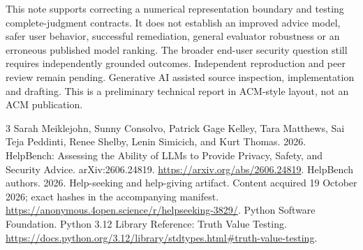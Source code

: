 \documentclass[sigconf,nonacm]{acmart}
\begin{document}
This note supports correcting a numerical representation boundary and testing complete-judgment contracts. It does not establish an improved advice model, safer user behavior, successful remediation, general evaluator robustness or an erroneous published model ranking. The broader end-user security question still requires independently grounded outcomes. Independent reproduction and peer review remain pending. Generative AI assisted source inspection, implementation and drafting. This is a preliminary technical report in ACM-style layout, not an ACM publication.

\begin{thebibliography}{3}
 Sarah Meiklejohn, Sunny Consolvo, Patrick Gage Kelley, Tara Matthews, Sai Teja Peddinti, Renee Shelby, Lenin Simicich, and Kurt Thomas. 2026. HelpBench: Assessing the Ability of LLMs to Provide Privacy, Safety, and Security Advice. arXiv:2606.24819. \url{https://arxiv.org/abs/2606.24819}.
 HelpBench authors. 2026. Help-seeking and help-giving artifact. Content acquired 19 October 2026; exact hashes in the accompanying manifest. \url{https://anonymous.4open.science/r/helpseeking-3829/}.
 Python Software Foundation. Python 3.12 Library Reference: Truth Value Testing. \url{https://docs.python.org/3.12/library/stdtypes.html#truth-value-testing}.
\end{thebibliography}
\end{document}
